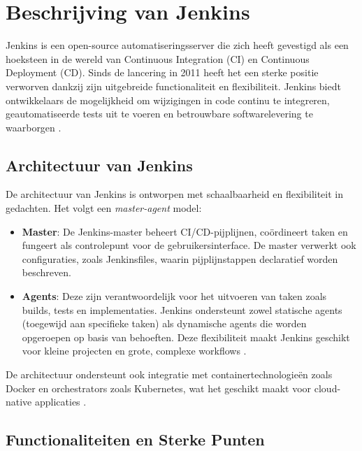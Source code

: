  
\section{Beschrijving van Jenkins}

Jenkins is een open-source automatiseringsserver die zich heeft gevestigd als een hoeksteen in de wereld van Continuous Integration (CI) en Continuous Deployment (CD). Sinds de lancering in 2011 heeft het een sterke positie verworven dankzij zijn uitgebreide functionaliteit en flexibiliteit. Jenkins biedt ontwikkelaars de mogelijkheid om wijzigingen in code continu te integreren, geautomatiseerde tests uit te voeren en betrouwbare softwarelevering te waarborgen \autocite{shahin2017}.

\subsection{Architectuur van Jenkins}

De architectuur van Jenkins is ontworpen met schaalbaarheid en flexibiliteit in gedachten. Het volgt een \textit{master-agent} model:
\begin{itemize}
    \item \textbf{Master}: De Jenkins-master beheert CI/CD-pijplijnen, coördineert taken en fungeert als controlepunt voor de gebruikersinterface. De master verwerkt ook configuraties, zoals Jenkinsfiles, waarin pijplijnstappen declaratief worden beschreven.
    \item \textbf{Agents}: Deze zijn verantwoordelijk voor het uitvoeren van taken zoals builds, tests en implementaties. Jenkins ondersteunt zowel statische agents (toegewijd aan specifieke taken) als dynamische agents die worden opgeroepen op basis van behoeften. Deze flexibiliteit maakt Jenkins geschikt voor kleine projecten en grote, complexe workflows \autocite{springer2023ci}.
\end{itemize}

De architectuur ondersteunt ook integratie met containertechnologieën zoals Docker en orchestrators zoals Kubernetes, wat het geschikt maakt voor cloud-native applicaties \autocite{amaral2021}.

\subsection{Functionaliteiten en Sterke Punten}

